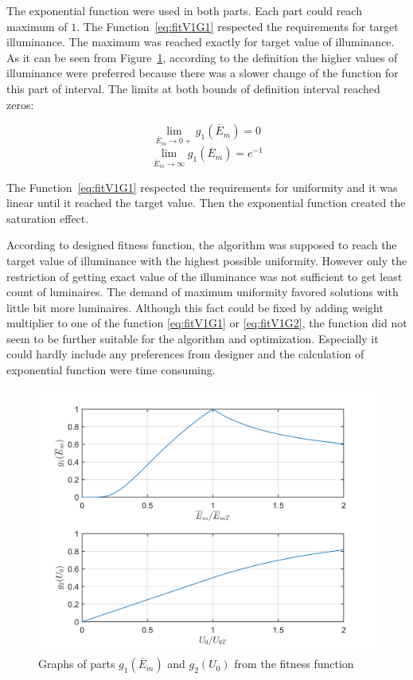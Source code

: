 The exponential function were used in both parts. Each part could reach maximum of $1$. The Function~\ref{eq:fitV1G1} respected the requirements for target illuminance. The maximum was reached exactly for target value of illuminance. As it can be seen from Figure~\ref{fig:fitV1G1G2}, according to the definition the higher values of illuminance were preferred because there was a slower change of the function for this part of interval. The limits at both bounds of definition interval reached zeros:

\begin{equation}
\label{eq:g1lim0}
\lim_{\overline{E}_{m}\to 0+} g_1\left(\overline{E}_{m}\right) = 0
\end{equation}
\begin{equation}
\label{eq:g1limInf}
\lim_{\overline{E}_{m}\to \infty} g_1\left(\overline{E}_{m}\right) = e^{-1}
\end{equation}

The Function~\ref{eq:fitV1G1} respected the requirements for uniformity and it was linear until it reached the target value. Then the exponential function created the saturation effect.

According to designed fitness function, the algorithm was supposed to reach the target value of illuminance with the highest possible uniformity. However only the restriction of getting exact value of the illuminance was not sufficient to get least count of luminaires. The demand of maximum uniformity favored solutions with little bit more luminaires. Although this fact could be fixed by adding weight multiplier to one of the function \ref{eq:fitV1G1} or \ref{eq:fitV1G2}, the function did not seem to be further suitable for the algorithm and optimization. Especially it could hardly include any preferences from designer and the calculation of exponential function were time consuming.

\begin{figure}[htb]
  \centering
  \includegraphics[width=\columnwidth]{obrG1G2}
  \caption{Graphs of parts $g_1\left(\overline{E}_{m}\right)$ and $g_2\left(U_0\right)$ from the fitness function}
  \label{fig:fitV1G1G2}
\end{figure}

